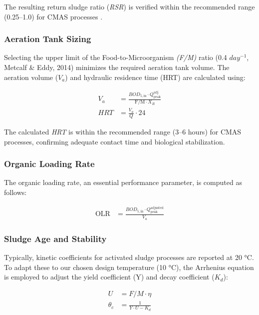 \documentclass[11pt]{article}
\begin{document}
The resulting return sludge ratio (\textit{RSR})
is verified within the recommended range (0.25–1.0) 
for CMAS processes \cite{metcalf_2014_wastewater}.

\subsubsection{Aeration Tank Sizing}

Selecting the upper limit of the Food-to-Microorganism \textit{(F/M)} ratio 
(0.4 $day^{-1}$, Metcalf \& Eddy, 2014) minimizes the required aeration 
tank volume. The aeration volume ($V_a$) and hydraulic residence time (HRT) 
are calculated using:

\begin{align}
V_a &= \frac{BOD_{5,\text{in}} \cdot Q_{\text{peak}}^{\text{adj}}}{\text{F/M} \cdot X_R} \label{eq:aeration_volume}\\
HRT &= \frac{V_a}{Q} \cdot 24 \label{eq:aeration_time}
\end{align}

The calculated \textit{HRT} is within the recommended range 
(3–6 hours) for CMAS processes, confirming adequate contact 
time and biological stabilization.

\subsubsection{Organic Loading Rate}
The organic loading rate, an essential performance parameter, is computed as follows:

\begin{align}
\text{OLR} &= \frac{BOD_{5,\text{in}} \cdot Q_{\text{peak}}^{\text{adjusted}}}{V_a}\label{eq:organic_load_rate}
\end{align}

\subsubsection{Sludge Age and Stability}

Typically, kinetic coefficients for activated 
sludge processes are reported at 20 °C. To adapt 
these to our chosen design temperature (10 °C), 
the Arrhenius equation is employed to adjust the 
yield coefficient (Y) and decay coefficient ($K_d$):

\begin{align}
U &= F/M \cdot \eta \label{eq:utilization_ratio}\\
\theta_c &= \frac{1}{Y \cdot U - K_d} \label{eq:sludge_age}
\end{align}
\end{document}
